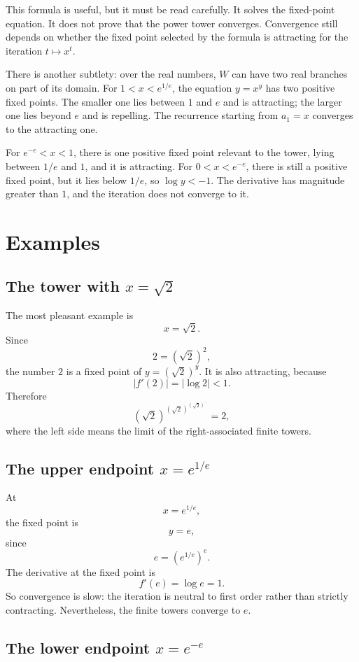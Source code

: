 \documentclass{essay}
\begin{document}
This formula is useful, but it must be read carefully. It solves the
fixed-point equation. It does not prove that the power tower converges.
Convergence still depends on whether the fixed point selected by the formula
is attracting for the iteration \(t\mapsto x^{t}\).

There is another subtlety: over the real numbers, \(W\) can have two real
branches on part of its domain. For \(1<x<e^{1/e}\), the equation \(y=x^{y}\)
has two positive fixed points. The smaller one lies between \(1\) and \(e\)
and is attracting; the larger one lies beyond \(e\) and is repelling. The
recurrence starting from \(a_{1}=x\) converges to the attracting one.

For \(e^{-e}<x<1\), there is one positive fixed point relevant to the tower,
lying between \(1/e\) and \(1\), and it is attracting. For \(0<x<e^{-e}\),
there is still a positive fixed point, but it lies below \(1/e\), so
\(\log y<-1\). The derivative has magnitude greater than \(1\), and the
iteration does not converge to it.

\section{Examples}

\subsection*{The tower with \(x=\sqrt{2}\)}

The most pleasant example is
\[ x=\sqrt{2}. \]
Since
\[ 2=(\sqrt{2})^{2}, \]
the number \(2\) is a fixed point of \(y=(\sqrt{2})^{y}\). It is also attracting,
because
\[ |f'(2)|=|\log 2|<1. \]
Therefore
\[ \left(\sqrt{2}\right)^{\left(\sqrt{2}\right)^{\left(\sqrt{2}\right)^{\cdots}}}=2, \]
where the left side means the limit of the right-associated finite towers.

\subsection*{The upper endpoint \(x=e^{1/e}\)}

At
\[ x=e^{1/e}, \]
the fixed point is
\[ y=e, \]
since
\[ e=(e^{1/e})^{e}. \]
The derivative at the fixed point is
\[ f'(e)=\log e=1. \]
So convergence is slow: the iteration is neutral to first order rather than
strictly contracting. Nevertheless, the finite towers converge to \(e\).

\subsection*{The lower endpoint \(x=e^{-e}\)}
\end{document}
